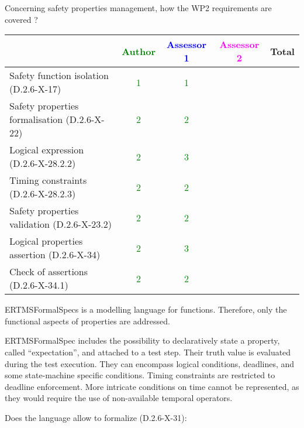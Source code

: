 Concerning safety properties management, how the WP2 requirements are covered ?

\begin{tabular}{|l | c | c | c | c|}
\hline
& \textcolor{green}{Author} & \textcolor{blue}{Assessor 1} & \textcolor{magenta}{Assessor 2} & Total \\
\hline 
Safety function isolation (D.2.6-X-17)  & \textcolor{green}{1} & \textcolor{green}{1} & &  \\
\hline 
Safety properties formalisation (D.2.6-X-22)  & \textcolor{green}{2} & \textcolor{green}{2} & &  \\
\hline
Logical expression (D.2.6-X-28.2.2)  & \textcolor{green}{2} & \textcolor{green}{3} & &  \\
\hline
Timing constraints (D.2.6-X-28.2.3)  & \textcolor{green}{2} & \textcolor{green}{2} & &  \\
\hline
Safety properties validation (D.2.6-X-23.2)  & \textcolor{green}{2} & \textcolor{green}{2} & &  \\
\hline
Logical properties assertion (D.2.6-X-34)  & \textcolor{green}{2} & \textcolor{green}{3} & &  \\
\hline
Check  of assertions (D.2.6-X-34.1)  & \textcolor{green}{2} & \textcolor{green}{2} & &  \\
\hline
\end{tabular}

\begin{author_comment}
ERTMSFormalSpecs is a modelling language for functions. Therefore, only the functional aspects of properties are addressed.  
\end{author_comment}

\begin{assessor1}
ERTMSFormalSpec includes the possibility to declaratively state a property, called "`expectation"', and attached to a test step. Their truth value is evaluated during the test execution. They can encompass logical conditions, deadlines, and some state-machine specific conditions. 
Timing constraints are restricted to deadline enforcement. More intricate conditions on time cannot be represented, as they would require the use of non-available temporal operators. 
\end{assessor1}

Does the language allow to  formalize (D.2.6-X-31):

